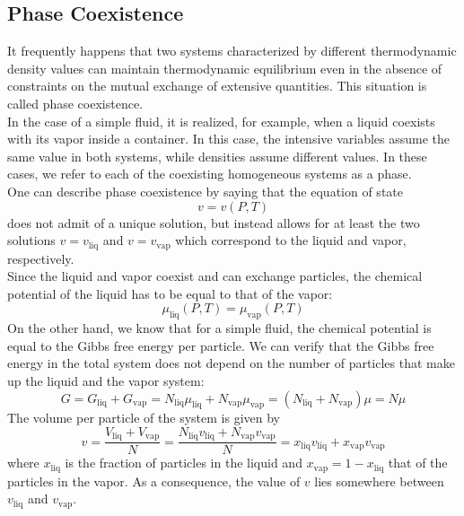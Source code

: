 \documentclass[cyan]{elegantnote}
\begin{document}
\subsection{Phase Coexistence}
It frequently happens that two systems characterized by different thermodynamic density values can maintain thermodynamic equilibrium even in the absence of constraints on the mutual exchange of extensive quantities. This situation is called phase coexistence.
\\
In the case of a simple fluid, it is realized, for example, when a liquid coexists with its vapor inside a container. In this case, the intensive variables assume the same value in both systems, while densities assume different values. In these cases, we refer to each of the coexisting homogeneous systems as a phase.
\\
One can describe phase coexistence by saying that the equation of state
\[v = v(P,T)\]
does not admit of a unique solution, but instead allows for at least the two solutions $v = v_{\mathrm{liq}}$ and $v = v_{\mathrm{vap}}$ which correspond to the liquid and vapor, respectively.
\\
Since the liquid and vapor coexist and can exchange particles, the chemical potential of the liquid has to be equal to that of the vapor:
\[\mu_{\mathrm{liq}}(P,T) = \mu_{\mathrm{vap}}(P,T)\]
On the other hand, we know that for a simple fluid, the chemical potential is equal to the Gibbs free energy per particle. We can verify that the Gibbs free energy in the total system does not depend on the number of particles that make up the liquid and the vapor system:
\[G= G_{\mathrm{liq}} + G_{\mathrm{vap}} = N_{\mathrm{liq}}\mu_{\mathrm{liq}} + N_{\mathrm{vap}}\mu_{\mathrm{vap}} = (N_{\mathrm{liq}}+N_{\mathrm{vap}})\mu = N\mu\]
The volume per particle of the system is given by
\[v = \frac{V_{\mathrm{liq}}+V_{\mathrm{vap}}}{N} = \frac{N_{\mathrm{liq}}v_{\mathrm{liq}} + N_{\mathrm{vap}}v_{\mathrm{vap}}}{N} = x_{\mathrm{liq}}v_{\mathrm{liq}}+x_{\mathrm{vap}}v_{\mathrm{vap}}\]
where $x_{\mathrm{liq}}$ is the fraction of particles in the liquid and $x_{\mathrm{vap}} = 1 - x_{\mathrm{liq}}$ that of the particles in the vapor. As a consequence, the value of $v$ lies somewhere between $v_{\mathrm{liq}}$ and $v_{\mathrm{vap}}$.
\end{document}
